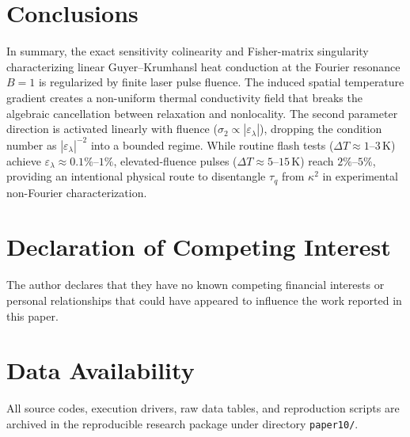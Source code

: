 \documentclass[preprint,12pt,a4paper]{elsarticle}
\begin{document}
\section{Conclusions}
In summary, the exact sensitivity colinearity and Fisher-matrix singularity characterizing linear Guyer--Krumhansl heat conduction at the Fourier resonance $B=1$ is regularized by finite laser pulse fluence. The induced spatial temperature gradient creates a non-uniform thermal conductivity field that breaks the algebraic cancellation between relaxation and nonlocality. The second parameter direction is activated linearly with fluence ($\sigma_2 \propto |\varepsilon_\lambda|$), dropping the condition number as $|\varepsilon_\lambda|^{-2}$ into a bounded regime. While routine flash tests ($\Delta T \approx 1$--$3\,\si{\kelvin}$) achieve $\varepsilon_\lambda \approx 0.1\%$--$1\%$, elevated-fluence pulses ($\Delta T \approx 5$--$15\,\si{\kelvin}$) reach $2\%$--$5\%$, providing an intentional physical route to disentangle $\tau_q$ from $\kappa^2$ in experimental non-Fourier characterization.

\section*{Declaration of Competing Interest}
The author declares that they have no known competing financial interests or personal relationships that could have appeared to influence the work reported in this paper.

\section*{Data Availability}
All source codes, execution drivers, raw data tables, and reproduction scripts are archived in the reproducible research package under directory \texttt{paper10/}.



\end{document}
